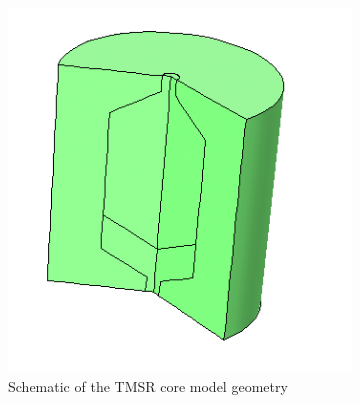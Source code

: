 \documentclass{elsarticle}
\begin{document}
\begin{figure}[h]
  \centering
  \begin{subfigure}{0.59\textwidth}
    \includegraphics[width = \columnwidth]{./images/diffusion/model_geom.png}
    \caption{Schematic of the TMSR core model geometry}
  \end{subfigure}
  ~
  \begin{subfigure}{0.35\textwidth}

\end{subfigure}
\end{figure}
\end{document}
